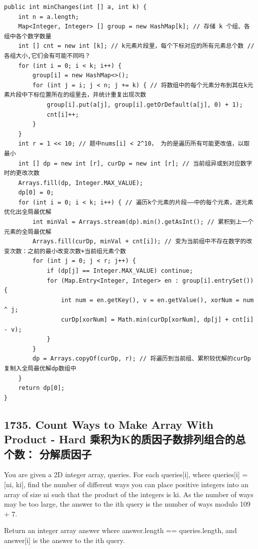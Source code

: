 \documentclass[9pt, b5paaper]{book}
\begin{document}
\begin{enumerate}
\begin{verbatim}
public int minChanges(int [] a, int k) {
    int n = a.length;
    Map<Integer, Integer> [] group = new HashMap[k]; // 存储 k 个组、各组中各个数字数量
    int [] cnt = new int [k]; // k元素片段里，每个下标对应的所有元素总个数 // 各组大小,它们会有可能不同吗？
    for (int i = 0; i < k; i++) {
        group[i] = new HashMap<>();
        for (int j = i; j < n; j += k) { // 将数组中的每个元素分布到其在k元素片段中下标位置所在的组里去，并统计重复出现次数
            group[i].put(a[j], group[i].getOrDefault(a[j], 0) + 1);
            cnt[i]++;
        }
    }
    int r = 1 << 10; // 题中nums[i] < 2^10， 为的是遍历所有可能更改值，以取最小
    int [] dp = new int [r], curDp = new int [r]; // 当前组异或到对应数字时的更改次数
    Arrays.fill(dp, Integer.MAX_VALUE);
    dp[0] = 0;
    for (int i = 0; i < k; i++) { // 遍历k个元素的片段——中的每个元素，逐元素优化出全局最优解
        int minVal = Arrays.stream(dp).min().getAsInt(); // 累积到上一个元素的全局最优解
        Arrays.fill(curDp, minVal + cnt[i]); // 变为当前组中不存在数字的改变次数：之前的最小改变次数+当前组元素个数
        for (int j = 0; j < r; j++) {
            if (dp[j] == Integer.MAX_VALUE) continue;
            for (Map.Entry<Integer, Integer> en : group[i].entrySet()) {
                int num = en.getKey(), v = en.getValue(), xorNum = num ^ j;
                curDp[xorNum] = Math.min(curDp[xorNum], dp[j] + cnt[i] - v);
            }
        }
        dp = Arrays.copyOf(curDp, r); // 将遍历到当前组、累积较优解的curDp复制入全局最优解dp数组中
    }
    return dp[0];
}
\end{verbatim}
\end{enumerate}

\subsection{1735. Count Ways to Make Array With Product - Hard 乘积为K的质因子数排列组合的总个数： 分解质因子}
\label{sec-1-4-63}
You are given a 2D integer array, queries. For each queries[i], where queries[i] = [ni, ki], find the number of different ways you can place positive integers into an array of size ni such that the product of the integers is ki. As the number of ways may be too large, the answer to the ith query is the number of ways modulo 109 + 7.

Return an integer array answer where answer.length == queries.length, and answer[i] is the answer to the ith query.
\end{document}
